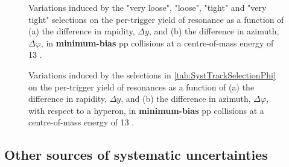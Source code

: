 \begin{figure}[!p]
\centering
{}
\centering
{}
\caption{Variations induced by the "very loose", "loose", "tight" and "very tight"  \rmXiPM selections on the per-trigger yield of \rmPhiMes resonance as a function of (a) the difference in rapidity, $\Delta y$, and (b) the difference in azimuth, $\Delta \varphi$, in \textbf{minimum-bias} pp collisions at a centre-of-mass energy of 13 \tev.}
	\label{fig:SystPerTriggerYieldXiRatioCascade}
\end{figure}

\begin{figure}[!p]
\centering
{}
\centering
{}
\caption{Variations induced by the selections in \tab\ref{tab:SystTrackSelectionPhi} on the per-trigger yield of \rmPhiMes resonances as a function of (a) the difference in rapidity, $\Delta y$, and (b) the difference in azimuth, $\Delta \varphi$, with respect to a \rmXi hyperon, in \textbf{minimum-bias} pp collisions at a centre-of-mass energy of 13 \tev.}
	\label{fig:SystPerTriggerYieldXiRatio}
\end{figure}

\clearpage

\subsection{Other sources of systematic uncertainties}

